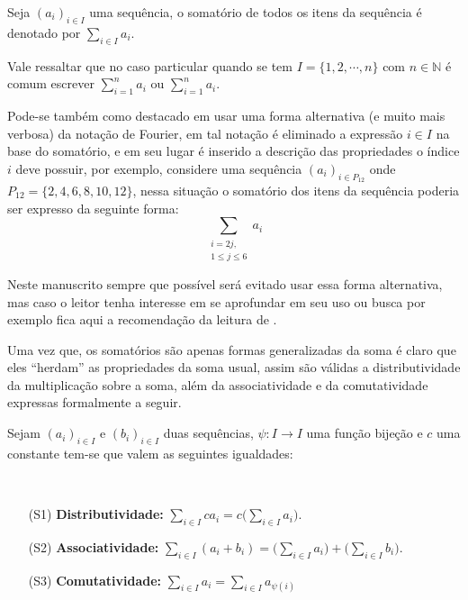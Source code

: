 \begin{definition}[Somatório]\label{def:Somatorio}
	Seja $(a_i)_{i \in I}$ uma sequência, o somatório de todos os itens da sequência é denotado por $\displaystyle \sum_{i \in I} a_i$.
\end{definition}

\begin{rema}
	Vale ressaltar que no caso particular quando se tem $I = \{1, 2, \cdots, n\}$ com $n \in \mathbb{N}$ é comum escrever $\displaystyle \sum_{i = 1}^n a_i$ ou $\sum_{i = 1}^n a_i$.
\end{rema}

Pode-se também como destacado em \cite{knuth-livro} usar uma forma alternativa (e muito mais verbosa) da notação de Fourier, em tal notação é  eliminado a expressão $i \in I$ na base do somatório, e em seu lugar é inserido a descrição das propriedades o índice $i$ deve possuir, por exemplo, considere uma sequência $(a_i)_{i \in P_{12}}$ onde $P_{12} = \{2, 4, 6, 8, 10, 12\}$, nessa situação o somatório dos itens da sequência poderia ser expresso da seguinte forma:
$$\sum_{\substack{i = 2j, \\ 1 \leq j \leq 6}} a_i$$

Neste manuscrito sempre que possível será evitado usar essa forma alternativa, mas caso o leitor tenha interesse em se aprofundar em seu uso ou busca por exemplo fica aqui a recomendação da leitura de \cite{carmo2013, knuth-livro}.

Uma vez que, os somatórios são apenas formas generalizadas da soma é claro que eles ``herdam'' as propriedades da soma usual, assim são válidas a distributividade da multiplicação sobre a soma, além da associatividade e da comutatividade expressas formalmente a seguir.

\begin{definition}
	Sejam $(a_i)_{i \in I}$ e $(b_i)_{i \in I}$ duas sequências, $\psi: I \rightarrow I$ uma função bijeção e $c$ uma constante  tem-se que valem as seguintes igualdades:
	
	\
	
	\begin{itemize}
		\item[(S1)] \textbf{Distributividade:} $\displaystyle \sum_{i \in I} c a_i = c \Big(\sum_{i \in I} a_i\Big)$.
		\item[(S2)] \textbf{Associatividade:} $\displaystyle \sum_{i \in I} (a_i + b_i) = \Big(\sum_{i \in I} a_i \Big) + \Big(\sum_{i \in I} b_i\Big)$.
		\item[(S3)] \textbf{Comutatividade:} $\displaystyle \sum_{i \in I} a_i = \sum_{i \in I} a_{\psi(i)}$
	\end{itemize}
\end{definition}

